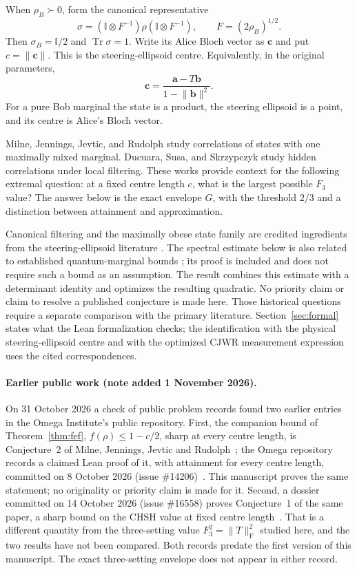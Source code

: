 \documentclass[11pt]{article}
\newcommand{\tr}{\operatorname{Tr}}
\newcommand{\Id}{\mathbb{I}}
\newcommand{\norm}[1]{\lVert #1\rVert}
\begin{document}
When $\rho_B\succ0$, form the canonical representative
\begin{equation}\label{eq:canonical}
 \sigma=(\Id\otimes F^{-1})\rho(\Id\otimes F^{-1}),
 \qquad F=(2\rho_B)^{1/2}.
\end{equation}
Then $\sigma_B=\Id/2$ and $\tr\sigma=1$. Write its Alice Bloch vector as $\mathbf c$ and put $c=\norm{\mathbf c}$. This is the steering-ellipsoid centre. Equivalently, in the original parameters,
\[
 \mathbf c=\frac{\mathbf a-T\mathbf b}{1-\norm{\mathbf b}^{2}}.
\]
For a pure Bob marginal the state is a product, the steering ellipsoid is a point, and its centre is Alice's Bloch vector.

Milne, Jennings, Jevtic, and Rudolph \cite{Milne} study correlations of states with one maximally mixed marginal. Ducuara, Susa, and Skrzypczyk \cite{Ducuara} study hidden correlations under local filtering. These works provide context for the following extremal question: at a fixed centre length $c$, what is the largest possible $F_3$ value? The answer below is the exact envelope $G$, with the threshold $2/3$ and a distinction between attainment and approximation.

Canonical filtering and the maximally obese state family are credited ingredients from the steering-ellipsoid literature \cite{Milne}. The spectral estimate below is also related to established quantum-marginal bounds \cite{Bravyi}; its proof is included and does not require such a bound as an assumption. The result combines this estimate with a determinant identity and optimizes the resulting quadratic. No priority claim or claim to resolve a published conjecture is made here. Those historical questions require a separate comparison with the primary literature. Section~\ref{sec:formal} states what the Lean formalization checks; the identification with the physical steering-ellipsoid centre and with the optimized CJWR measurement expression uses the cited correspondences.

\paragraph{Earlier public work (note added 1 November 2026).}
On 31 October 2026 a check of public problem records found two earlier entries in the Omega Institute's public repository. First, the companion bound of Theorem~\ref{thm:fef}, $f(\rho)\leq1-c/2$, sharp at every centre length, is Conjecture~2 of Milne, Jennings, Jevtic and Rudolph~\cite{Milne}; the Omega repository records a claimed Lean proof of it, with attainment for every centre length, committed on 8 October 2026 (issue \#14206)~\cite{OmegaFEF}. This manuscript proves the same statement; no originality or priority claim is made for it. Second, a dossier committed on 14 October 2026 (issue \#16558) proves Conjecture~1 of the same paper, a sharp bound on the CHSH value at fixed centre length~\cite{OmegaCHSH}. That is a different quantity from the three-setting value $F_3^2=\norm{T}_{\mathrm F}^2$ studied here, and the two results have not been compared. Both records predate the first version of this manuscript. The exact three-setting envelope does not appear in either record.
\end{document}
